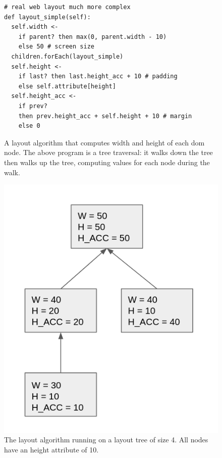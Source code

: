\begin{figure}
\begin{minipage}[b]{0.68\linewidth}
\begin{verbatim}
# real web layout much more complex
def layout_simple(self): 
  self.width <-
    if parent? then max(0, parent.width - 10)
    else 50 # screen size
  children.forEach(layout_simple)
  self.height <-
    if last? then last.height_acc + 10 # padding
    else self.attribute[height]
  self.height_acc <-
    if prev?
    then prev.height_acc + self.height + 10 # margin
    else 0
\end{verbatim}
\caption{A layout algorithm that computes width and height of each dom node. The above program is a tree traversal: it walks down the tree then walks up the tree, computing values for each node during the walk.}
\label{fig:layout-simple}
\end{minipage}\hfill%
\begin{minipage}[b]{0.28\linewidth}
\centering
\includegraphics[scale=0.23]{LayoutExample.png}
\caption{The layout algorithm running on a layout tree of size 4. All nodes have an height attribute of 10.}
\end{minipage}
\end{figure}

